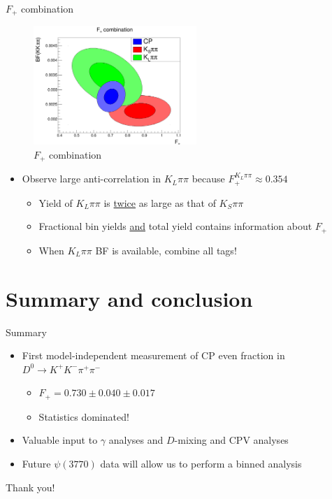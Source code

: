 \documentclass{beamer}
\begin{document}
\begin{frame}{$F_+$ combination}
  \begin{figure}
    \includegraphics[width = 0.55\textwidth]{Plots/FPlus_contours.png}
    \caption{$F_+$ combination}
  \end{figure}
  \vspace{-0.6cm}
  \begin{itemize}
    \item{Observe large anti-correlation in $K_L\pi\pi$ because $F^{K_L\pi\pi}_+\approx 0.354$}
    \begin{itemize}
      \item{Yield of $K_L\pi\pi$ is \underline{twice} as large as that of $K_S\pi\pi$}
      \item{Fractional bin yields \underline{and} total yield contains information about $F_+$}
      \item{When $K_L\pi\pi$ BF is available, combine all tags!}
    \end{itemize}
  \end{itemize}
\end{frame}

\section{Summary and conclusion}

\begin{frame}{Summary}
  \begin{itemize}
    \setlength\itemsep{1.0em}
    \item{First model-independent measurement of CP even fraction in $D^0\to K^+K^-\pi^+\pi^-$}
    \begin{itemize}
      \item{$F_+ = 0.730 \pm 0.040 \pm 0.017$}
      \item{Statistics dominated!}
    \end{itemize}
    \item{Valuable input to $\gamma$ analyses and $D$-mixing and CPV analyses}
    \item{Future $\psi(3770)$ data will allow us to perform a binned analysis}
  \end{itemize}
  \begin{center}
    {\huge Thank you!}
  \end{center}
\end{frame}
\end{document}
